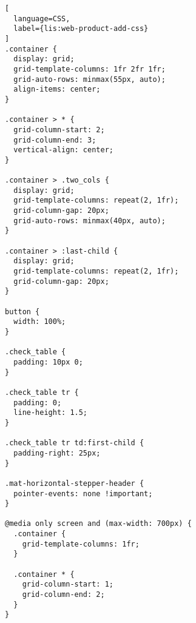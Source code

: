 \begin{lstlisting}[
  language=CSS,
  label={lis:web-product-add-css}
]
.container {
  display: grid;
  grid-template-columns: 1fr 2fr 1fr;
  grid-auto-rows: minmax(55px, auto);
  align-items: center;
}

.container > * {
  grid-column-start: 2;
  grid-column-end: 3;
  vertical-align: center;
}

.container > .two_cols {
  display: grid;
  grid-template-columns: repeat(2, 1fr);
  grid-column-gap: 20px;
  grid-auto-rows: minmax(40px, auto);
}

.container > :last-child {
  display: grid;
  grid-template-columns: repeat(2, 1fr);
  grid-column-gap: 20px;
}

button {
  width: 100%;
}

.check_table {
  padding: 10px 0;
}

.check_table tr {
  padding: 0;
  line-height: 1.5;
}

.check_table tr td:first-child {
  padding-right: 25px;
}

.mat-horizontal-stepper-header {
  pointer-events: none !important;
}

@media only screen and (max-width: 700px) {
  .container {
    grid-template-columns: 1fr;
  }

  .container * {
    grid-column-start: 1;
    grid-column-end: 2;
  }
}
\end{lstlisting}